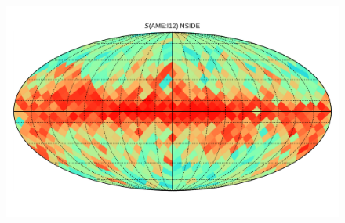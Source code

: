       \begin{figure}

        \includegraphics[width=\textwidth]{../Plots/Allsky_Corr/Spearman_Map_nside8_AMEtoI12.pdf}
        \centering
        \caption{}
        \label{fig:Spearman_Map_nside8_AMEtoIR}
      \end{figure}

